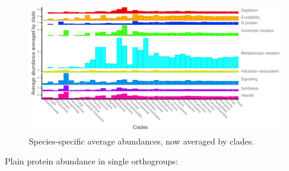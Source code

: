 \begin{Shaded}
\begin{Highlighting}[]
\NormalTok{    ,} \NormalTok{(} \NormalTok{)}
\NormalTok{    ,} \NormalTok{()}
\NormalTok{    ,} \NormalTok{(} \NormalTok{)}
\NormalTok{    ,} \NormalTok{(} \NormalTok{, } \NormalTok{, } \NormalTok{)}
\NormalTok{  )}
\end{Highlighting}
\end{Shaded}

\begin{figure}

{\centering \includegraphics{figs/analysis.abundance.unnamed-chunk-5-1} 

}

\caption{Species-specific average abundances, now averaged by clades.}\label{fig:unnamed-chunk-5}
\end{figure}

Plain protein abundance in single orthogroups:

